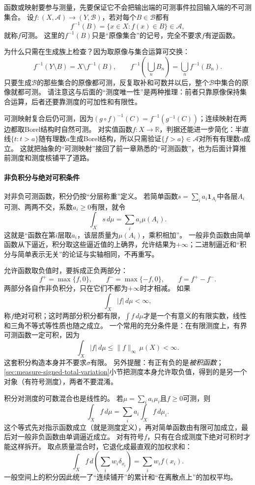函数或映射要参与测量，先要保证它不会把输出端的可测事件拉回输入端的不可测集合。
设$f:(X,\mathcal A)\to(Y,\mathcal B)$，若对每个$B\in\mathcal B$都有
\[
 f^{-1}(B)=\{x\in X:f(x)\in B\}\in\mathcal A,
\]
就称$f$可测。
这里的$f^{-1}(B)$只是“原像集合”的记号，完全不要求$f$有逆函数。

为什么只需在生成族上检查？因为取原像与集合运算可交换：
\[
 f^{-1}(Y\setminus B)=X\setminus f^{-1}(B),\qquad
 f^{-1}\!\left(\bigcup_nB_n\right)=\bigcup_nf^{-1}(B_n).
\]
只要生成$\mathcal B$的那些集合的原像都可测，反复取补和可数并以后，整个$\mathcal B$中集合的原像就都可测。
请注意这与后面的“测度唯一性”是两种推理：前者只靠原像保持集合运算，后者还要靠测度的可加性和有限性。

可测映射复合后仍可测，因为$(g\circ f)^{-1}(C)=f^{-1}(g^{-1}(C))$；连续映射在两边都取Borel结构时自然可测。
对实值函数$f:X\to\mathbb R$，判据还能进一步简化：半直线$\{t:t>a\}$随有理数$a$生成Borel结构，所以只需验证$\{f>a\}\in\mathcal A$对所有有理数$a$成立。
这就把抽象的“可测映射”接回了前一章熟悉的“可测函数”，也为后面计算推前测度和测度核铺平了道路。

\paragraph{非负积分与绝对可积条件}

对非负可测函数，积分仍按“分层称重”定义。
若简单函数$s=\sum_i a_i\mathbf 1_{A_i}$中各层$A_i$可测、两两不交，系数$a_i\geq0$有限，就令
\[
 \int_X s\,d\mu=\sum_i a_i\mu(A_i).
\]
这就是“函数在第$i$层取$a_i$，该层质量为$\mu(A_i)$，乘积相加”。
一般非负函数由简单函数从下逼近，积分取这些逼近值的上确界，允许结果为$+\infty$；二进制逼近和“积分与简单表示无关”的论证与实轴相同，不再重写。

允许函数取负值时，要拆成正负两部分：
\[
 f^+=\max\{f,0\},\qquad f^-=\max\{-f,0\},\qquad f=f^+-f^-.
\]
两部分各自作非负积分，只在它们不都为$+\infty$时才相减。
如果
\[
 \int_X|f|\,d\mu<\infty,
\]
称$f$绝对可积；这时两部分积分都有限，$\int f\,d\mu$才是一个有意义的有限实数，线性和三角不等式等性质也随之成立。
一个常用的充分条件是：在有限测度上，有界可测函数一定可积，因为
\[
 \int_X|f|\,d\mu\leq\|f\|_\infty\,\mu(X)<\infty.
\]
这套积分构造本身并不要求$\sigma$有限。
另外提醒：有正有负的是\emph{被积函数}；\ref{sec:measure-signed-total-variation}小节把测度本身允许取负值，得到的是另一个对象（有符号测度），两者不要混淆。

积分对测度的可数混合也是线性的。
若$\mu=\sum_i a_i\mu_i$且$f\geq0$可测，则
\[
 \int_X f\,d\mu=\sum_i a_i\int_X f\,d\mu_i.
\]
这个等式先对指示函数成立（就是测度定义），再对简单函数由有限可加成立，最后对一般非负函数由单调逼近成立。
对有符号$f$，只有在合成测度下绝对可积时才能这样拆开。
取点质量混合时，它退化成最直观的加权求和：
\[
 \int_X f\,d\!\left(\sum_i w_i\delta_{x_i}\right)=\sum_i w_i f(x_i).
\]
一般空间上的积分因此统一了“连续铺开”的累计和“在离散点上”的加权平均。

